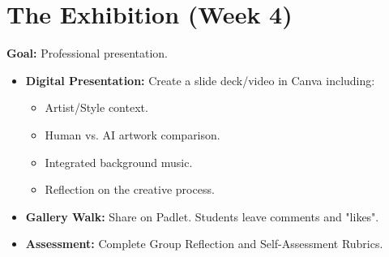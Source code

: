 \documentclass[11pt, a4paper]{article}
\begin{document}
\section{The Exhibition (Week 4)}
\textbf{Goal:} Professional presentation.
\begin{itemize}
    \item \textbf{Digital Presentation:} Create a slide deck/video in Canva including:
    \begin{itemize}
        \item Artist/Style context.
        \item Human vs. AI artwork comparison.
        \item Integrated background music.
        \item Reflection on the creative process.
    \end{itemize}
    \item \textbf{Gallery Walk:} Share on Padlet. Students leave comments and "likes".
    \item \textbf{Assessment:} Complete Group Reflection and Self-Assessment Rubrics.
\end{itemize}
\end{document}
